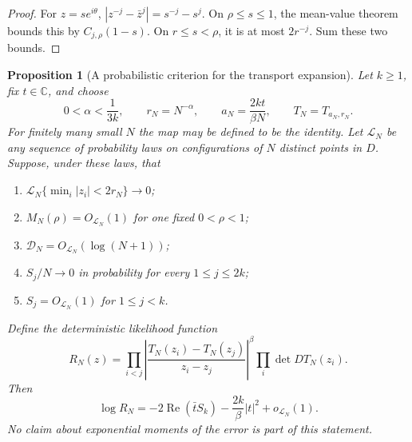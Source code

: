 \documentclass[11pt,a4paper]{article}
\numberwithin{equation}{section}
\newtheorem{proposition}[theorem]{Proposition}
\theoremstyle{definition}
\theoremstyle{remark}
\begin{document}
\begin{proof}
For $z=s e^{i\theta}$,
$|z^{-j}-\bar z^j|=s^{-j}-s^j$. On $\rho\leq s\leq1$, the
mean-value theorem bounds this by $C_{j,\rho}(1-s)$. On
$r\leq s<\rho$, it is at most $2r^{-j}$. Sum these two bounds.
\end{proof}

\begin{proposition}[A probabilistic criterion for the transport expansion]
\label{prop:transport-asymptotic-criterion}
Let $k\geq1$, fix $t\in\mathbb C$, and choose
\[
 0<\alpha<\frac1{3k},\qquad r_N=N^{-\alpha},\qquad
 a_N=\frac{2kt}{\beta N},\qquad T_N=T_{a_N,r_N}.
\]
For finitely many small $N$ the map may be defined to be the identity.
Let $\mathcal L_N$ be any sequence of probability laws on configurations
of $N$ distinct points in $D$. Suppose, under these laws, that
\begin{enumerate}
\item $\mathcal L_N\{\min_i|z_i|<2r_N\}\to0$;
\item $M_N(\rho)=O_{\mathcal L_N}(1)$ for one fixed $0<\rho<1$;
\item $\mathcal D_N=O_{\mathcal L_N}(\log(N+1))$;
\item $S_j/N\to0$ in probability for every $1\leq j\leq2k$;
\item $S_j=O_{\mathcal L_N}(1)$ for $1\leq j<k$.
\end{enumerate}
Define the deterministic likelihood function
\begin{equation}
 R_N(z)=
 \prod_{i<j}\left|\frac{T_N(z_i)-T_N(z_j)}{z_i-z_j}\right|^\beta
 \prod_i\det DT_N(z_i).
 \label{eq:transport-likelihood}
\end{equation}
Then
\begin{equation}
 \log R_N=-2\operatorname{Re}(\bar tS_k)
                       -\frac{2k}{\beta}|t|^2
                       +o_{\mathcal L_N}(1).
 \label{eq:higher-mode-likelihood-expansion}
\end{equation}
No claim about exponential moments of the error is part of this statement.
\end{proposition}
\end{document}
